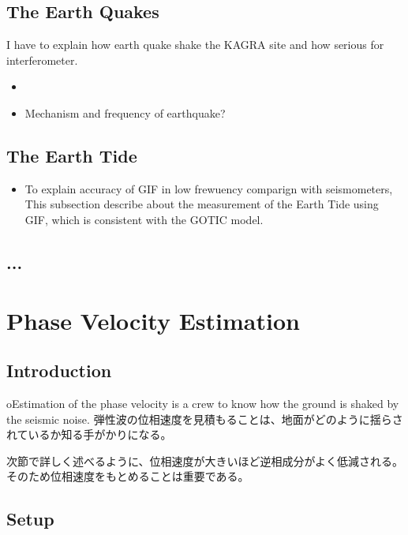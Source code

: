 \documentclass[a4paper,12pt]{book}
\begin{document}
\subsection{The Earth Quakes}
I have to explain how earth quake shake the KAGRA site and how serious for interferometer.
\begin{itemize}
\item 
\item Mechanism and frequency of earthquake?
\end{itemize}

\subsection{The Earth Tide}

\begin{itemize}
  \item To explain accuracy of GIF in low frewuency comparign with seismometers, This subsection describe about the measurement of the Earth Tide using GIF, which is consistent with the GOTIC model.
\end{itemize}

\subsection{...}




\section{Phase Velocity Estimation}
\subsection{Introduction}
oEstimation of the phase velocity is a crew to know how the ground is shaked by the seismic noise. 
弾性波の位相速度を見積もることは、地面がどのように揺らされているか知る手がかりになる。




次節で詳しく述べるように、位相速度が大きいほど逆相成分がよく低減される。そのため位相速度をもとめることは重要である。

\subsection{Setup}
\end{document}
